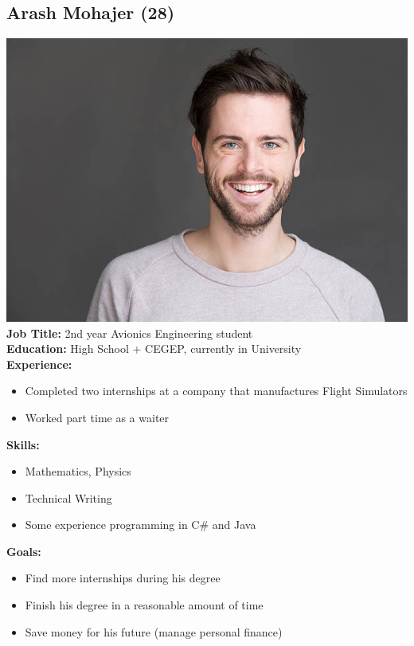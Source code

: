 \documentclass{article}
\begin{document}
\subsection*{Arash Mohajer (28)}
\includegraphics[scale=0.25]{arash.jpg}\\
\textbf{Job Title: }2nd year Avionics Engineering student \\
\textbf{Education:} High School + CEGEP, currently in University\\
\textbf{Experience:}
\begin{itemize}
\itemsep0em 
\item Completed two internships at a company that manufactures Flight Simulators
\item Worked part time as a waiter
\end{itemize}

\textbf{Skills:}
\begin{itemize}
\itemsep0em 
\item Mathematics, Physics
\item Technical Writing
\item Some experience programming in C\# and Java
\end{itemize}

\textbf{Goals:}
\begin{itemize}
\itemsep0em 
\item Find more internships during his degree
\item Finish his degree in a reasonable amount of time
\item Save money for his future (manage personal finance)
\end{itemize}
\end{document}
